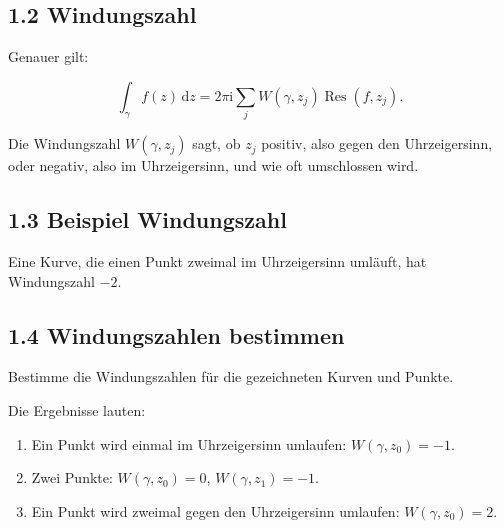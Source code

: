 \documentclass[11pt,a4paper]{article}
\newcommand{\ii}{\mathrm i}
\newcommand{\dd}{\,\mathrm d}
\newcommand{\Res}{\operatorname{Res}}
\begin{document}
\subsection{1.2 Windungszahl}
Genauer gilt:
\begin{importantbox}
\[
\int_\gamma f(z)\dd z=2\pi\ii\sum_j W(\gamma,z_j)\Res(f,z_j).
\]
\end{importantbox}
Die Windungszahl $W(\gamma,z_j)$ sagt, ob $z_j$ positiv, also gegen den Uhrzeigersinn, oder negativ, also im Uhrzeigersinn, und wie oft umschlossen wird.

\subsection{1.3 Beispiel Windungszahl}
Eine Kurve, die einen Punkt zweimal im Uhrzeigersinn umläuft, hat Windungszahl $-2$.

\subsection{1.4 Windungszahlen bestimmen}
\begin{fragebox}
Bestimme die Windungszahlen für die gezeichneten Kurven und Punkte.
\end{fragebox}
\begin{antwortbox}
Die Ergebnisse lauten:
\begin{enumerate}[label=\alph*)]
\item Ein Punkt wird einmal im Uhrzeigersinn umlaufen: $W(\gamma,z_0)=-1$.
\item Zwei Punkte: $W(\gamma,z_0)=0$, $W(\gamma,z_1)=-1$.
\item Ein Punkt wird zweimal gegen den Uhrzeigersinn umlaufen: $W(\gamma,z_0)=2$.
\end{enumerate}
\end{antwortbox}
\end{document}
